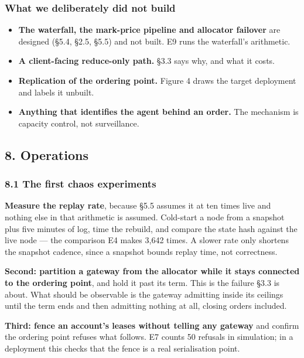 \documentclass[10pt,a4paper]{article}
\providecommand{\tightlist}{\setlength{\itemsep}{0pt}\setlength{\parskip}{0pt}}
\begin{document}
\subsubsection{What we deliberately did not build}\label{what-we-deliberately-did-not-build}

\begin{itemize}
\tightlist
\item
  \textbf{The waterfall, the mark-price pipeline and allocator failover} are designed
  (§5.4, §2.5, §5.5) and not built. E9 runs the waterfall's arithmetic.
\item
  \textbf{A client-facing reduce-only path.} §3.3 says why, and what it costs.
\item
  \textbf{Replication of the ordering point.} Figure 4 draws the target deployment and
  labels it unbuilt.
\item
  \textbf{Anything that identifies the agent behind an order.} The mechanism is
  capacity control, not surveillance.
\end{itemize}



\label{start:9}%

\subsection{8. Operations}\label{operations}

\subsubsection{8.1 The first chaos experiments}\label{the-first-chaos-experiments}

\textbf{Measure the replay rate}, because §5.5 assumes it at ten times live and
nothing else in that arithmetic is assumed. Cold-start a node from a snapshot
plus five minutes of log, time the rebuild, and compare the state hash against
the live node --- the comparison E4 makes 3,642 times. A slower rate only
shortens the snapshot cadence, since a snapshot bounds replay time, not
correctness.

\textbf{Second: partition a gateway from the allocator while it stays connected to the
ordering point}, and hold it past its term. This is the failure §3.3 is about.
What should be observable is the gateway admitting inside its ceilings until the
term ends and then admitting nothing at all, closing orders included.

\textbf{Third: fence an account's leases without telling any gateway} and confirm the
ordering point refuses what follows. E7 counts 50 refusals in simulation; in a
deployment this checks that the fence is a real serialisation point.
\end{document}
